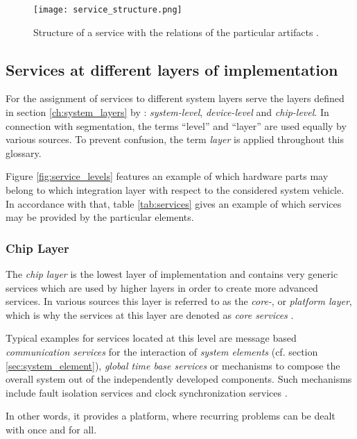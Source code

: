 \begin{figure}[!htbp]
\centering
\texttt{[image: service\_structure.png]}
\caption{Structure of a service with the relations of the particular artifacts \cite[p.45]{krafzig}.}
\label{fig:service}
\end{figure}





\subsection{Services at different layers of implementation}
\label{ch:service_layers}
For the assignment of services to different system layers serve the layers defined in section \ref{ch:system_layers} by \cite{genesys}: \emph{system-level}, \emph{device-level} and \emph{chip-level}. In connection with segmentation, the terms ``level'' and ``layer'' are used equally by various sources. To prevent confusion, the term \emph{layer} is applied throughout this glossary.

Figure \ref{fig:service_levels} features an example of which hardware parts may belong to which integration layer with respect to the considered system vehicle. In accordance with that, table \ref{tab:services} gives an example of which services may be provided by the particular elements.

\subsubsection{Chip Layer}
The \emph{chip layer} is the lowest layer of implementation and contains very generic services which are used by higher layers in order to create more advanced services. In various sources this layer is referred to as the \emph{core-}, or \emph{platform layer}, which is why the services at this layer are denoted as \emph{core services} \cite[p.44]{genesys}.

Typical examples for services located at this level are message based 
\emph{communication services} for the interaction of \emph{system elements} (cf. section \ref{sec:system_element}), \emph{global time base services} or mechanisms to compose the overall system out of the independently developed components. Such mechanisms include fault isolation services and clock synchronization services \cite[p.7-12]{genesys}.

In other words, it provides a platform, where recurring problems can be dealt with once and for all.

